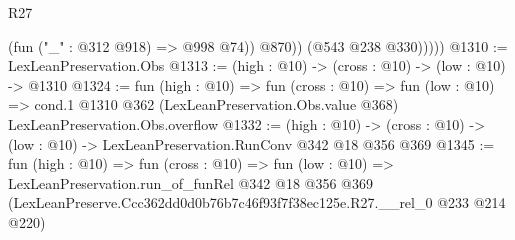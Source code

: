 \begin{lexlean}{R27}
\begin{coremodule}
                  (fun ("_" : @312 @918) => @998 @74))
                @870))
            (@543 @238 @330)))))
@1310 := LexLeanPreservation.Obs
@1313 := (high : @10) -> (cross : @10) -> (low : @10) -> @1310
@1324 := fun (high : @10) =>
  fun (cross : @10) =>
  fun (low : @10) =>
  cond.{1} @1310 @362 (LexLeanPreservation.Obs.value @368) LexLeanPreservation.Obs.overflow
@1332 := (high : @10) ->
  (cross : @10) -> (low : @10) -> LexLeanPreservation.RunConv @342 @18 @356 @369
@1345 := fun (high : @10) =>
  fun (cross : @10) =>
  fun (low : @10) =>
  LexLeanPreservation.run_of_funRel
    @342
    @18
    @356
    @369
    (LexLeanPreserve.Ccc362dd0d0b76b7c46f93f7f38ec125e.R27.__rel_0 @233 @214 @220)
\end{coremodule}
\end{lexlean}
